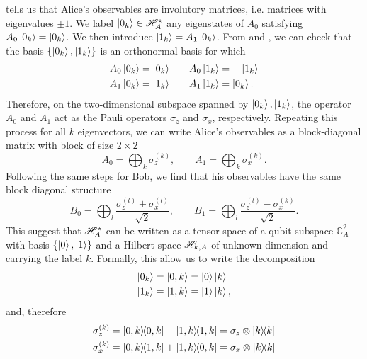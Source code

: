  tells us that Alice's observables are involutory matrices, i.e. matrices with eigenvalues $\pm 1$.
We label $\ket{0_k} \in \mathscr{H}_A^\star$ any eigenstates of $A_0$ satisfying $A_0 \ket{0_k} = \ket{0_k} $.
We then introduce $\ket{1_k} = A_1 \ket{0_k}$.
From  and , we can check that the basis $\{\ket{0_k},\ket{1_k}\}$ is an orthonormal basis for which
\begin{equation}
	\begin{split}
		A_0 \ket{0_k} = \ket{0_k} \qquad & A_0 \ket{1_k} = -\ket{1_k} \\
		A_1 \ket{0_k} = \ket{1_k} \qquad & A_1 \ket{1_k} = \ket{0_k}.
	\end{split}
\end{equation}
Therefore, on the two-dimensional subspace spanned by $\ket{0_k},\ket{1_k}$, the operator $A_0$ and $A_1$ act as the Pauli operators $\sigma_z$ and $\sigma_x$, respectively. 
Repeating this process for all $k$ eigenvectors, we can write Alice's observables as a block-diagonal matrix with block of size $2 \times 2$
\begin{equation}
	A_0 = \bigoplus_k \sigma_z^{(k)}, \qquad A_1 = \bigoplus_k \sigma_x^{(k)}.
\end{equation}
Following the same steps for Bob, we find that his observables have the same block diagonal structure
\begin{equation}
	B_0 = \bigoplus_l \frac{\sigma_z^{(l)}+\sigma_x^{(l)}}{\sqrt{2}}, \qquad B_1 = \bigoplus_l \frac{\sigma_z^{(l)}-\sigma_x^{(k)}}{\sqrt{2}}.
\end{equation}
This suggest that $\mathscr{H}_A^\star$ can be written as a tensor space of a qubit subspace $\mathds{C}_A^2$ with basis $\{\ket{0},\ket{1}\}$ and a Hilbert space $\mathscr{H}_{k,A}$ of unknown dimension and carrying the label $k$.
Formally, this allow us to write the decomposition
\begin{equation}
	\begin{split}
		\ket{0_k} &= \ket{0,k} = \ket{0}\ket{k} \\
		\ket{1_k} &= \ket{1,k} = \ket{1}\ket{k},
	\end{split}	
\end{equation}
and, therefore
\begin{equation}
	\begin{split}
		\sigma_z^{(k)} &= \ketbra{0,k}-\ketbra{1,k} = \sigma_z \otimes \ketbra{k} \\
		\sigma_x^{(k)} &= \ketbra{0,k}{1,k}+\ketbra{1,k}{0,k} = \sigma_x \otimes \ketbra{k}
	\end{split}
\end{equation}
